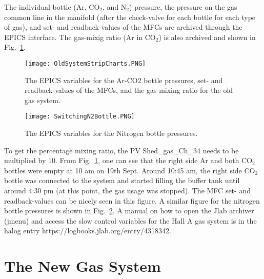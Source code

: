 The individual bottle (Ar, CO$_2$, and N$_2$) pressure, the pressure on the gas common line in the manifold
 (after the check-valve for each bottle for each type of gas), and set- and readback-values
 of the MFCs are archived through the EPICS interface. The gas-mixig ratio (Ar in CO$_2$) is
 also archived and shown in Fig.~\ref{fig:StripChartOldSystem}. 
\begin{figure}[h!]
\begin{center}
\texttt{[image: OldSystemStripCharts.PNG]}
\caption{The EPICS variables for the Ar-CO2 bottle pressures, set- and readback-values of the MFCs, and the gas mixing ratio for the old gas system.} 
\label{fig:StripChartOldSystem}
\end{center}
\end{figure}

\begin{figure}[h!]
\begin{center}
\texttt{[image: SwitchingN2Bottle.PNG]}
\caption{The EPICS variables for the Nitrogen bottle pressures.} 
\label{fig:NitrogenStripChart}
\end{center}
\end{figure}
To get the percentage mixing ratio, the PV Shed\_gas\_Ch\_34 needs to be multiplied by 10.
 From Fig.~\ref{fig:StripChartOldSystem}, one can see that the right side Ar and both CO$_2$ bottles
 were empty at 10 am on 19th Sept. Around 10:45 am, the right side CO$_2$ bottle was connected to the
 system and started filling the buffer tank until around 4:30 pm (at this point, the gas usage was stopped).
 The MFC set- and readback-values can be nicely seen in this figure.
 A similar figure for the nitrogen bottle pressures is shown in Fig.~\ref{fig:NitrogenStripChart}. 
 A manual on how to open the Jlab archiver (jmenu) and access the slow control variables for the Hall A gas system is in the halog entry https://logbooks.jlab.org/entry/4318342.

\section{The New Gas System}

